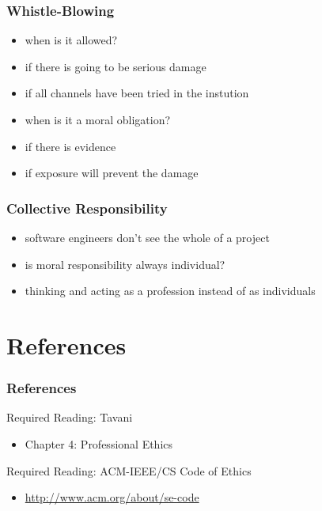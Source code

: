 \documentclass[dvipsnames]{beamer}
\theoremstyle{plain}
\begin{document}
\begin{frame}
  \frametitle{Whistle-Blowing}

  \begin{itemize}
    \item when is it allowed?
    \smallskip
    \item if there is going to be serious damage
    \item if all channels have been tried in the instution

    \pause
    \bigskip
    \item when is it a moral obligation?
    \smallskip
    \item if there is evidence
    \item if exposure will prevent the damage
  \end{itemize}
\end{frame}

\begin{frame}
  \frametitle{Collective Responsibility}

  \begin{itemize}
    \item software engineers don't see the whole of a project
    \item is moral responsibility always individual?

    \pause
    \medskip
    \item thinking and acting as a profession instead of as individuals
  \end{itemize}
\end{frame}

\section*{References}

\begin{frame}
  \frametitle{References}

  \begin{block}{Required Reading: Tavani}
    \begin{itemize}
      \item Chapter 4: \alert{Professional Ethics}
    \end{itemize}
  \end{block}

  \begin{block}{Required Reading: ACM-IEEE/CS Code of Ethics}
    \begin{itemize}
      \item \url{http://www.acm.org/about/se-code}
    \end{itemize}
  \end{block}
\end{frame}
\end{document}
